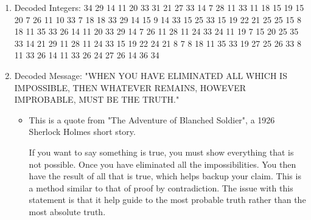\documentclass[11pt]{article}
\newcounter{prnum}
\newenvironment{problem}{{\vskip 0.2in\noindent\bf Problem
       \addtocounter{prnum}{1} \arabic{prnum}.}}{\vskip 0.1in}
\begin{document}
\begin{problem}
\begin{enumerate}
      \pagebreak
    \item Decoded Integers: 34 29 14 11 20 33 31 21 27 33 14 7 28 11 33 11 18 15 19 15 20 7 26 
      11 10 33 7 18 18 33 29 14 15 9 14 33 15 25 33 15 19 22 21 25 25 15 8 18 11 35 33 26 
      14 11 20 33 29 14 7 26 11 28 11 24 33 24 11 19 7 15 20 25 35 33 14 21 29 11 28 11 24 33 
      15 19 22 24 21 8 7 8 18 11 35 33 19 27 25 26 33 8 11 33 26 14 11 33 26 24 27 26 14 36 34  
    \item Decoded Message: "WHEN YOU HAVE ELIMINATED ALL 
      WHICH IS IMPOSSIBLE, THEN WHATEVER REMAINS, HOWEVER IMPROBABLE, MUST BE THE TRUTH." 
      \begin{itemize}
        \item This is a quote from "The Adventure of Blanched Soldier", 
          a 1926 Sherlock Holmes short story.

          If you want to say something is true, you must show everything that is
          not possible. Once you have eliminated all the impossibilities.
          You then have the result of all that is true, which helps backup your claim.
          This is a method similar to that of proof by contradiction.
          The issue with this statement is that 
          it help guide to the most probable truth rather than
          the most absolute truth.
      \end{itemize}
  \end{enumerate}
\end{problem}

\clearpage
\end{document}

